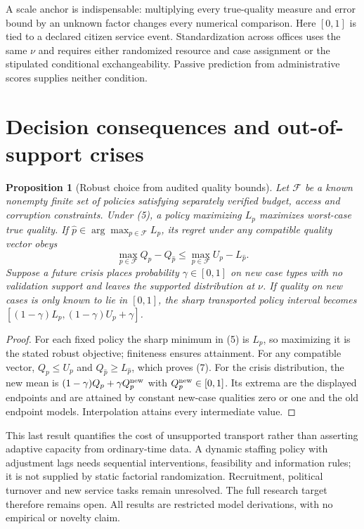 \documentclass[11pt]{article}
\newtheorem{proposition}[theorem]{Proposition}
\begin{document}
A scale anchor is indispensable: multiplying every true-quality measure
and error bound by an unknown factor changes every numerical comparison.
Here $[0,1]$ is tied to a declared citizen service event. Standardization
across offices uses the same $\nu$ and requires either randomized resource
and case assignment or the stipulated conditional exchangeability.
Passive prediction from administrative scores supplies neither condition.

\section{Decision consequences and out-of-support crises}
\begin{proposition}[Robust choice from audited quality bounds]
Let $\mathcal F$ be a known nonempty finite set of policies satisfying
separately verified budget, access and corruption constraints. Under (5),
a policy maximizing $L_p$ maximizes worst-case true quality. If
$\widehat p\in\arg\max_{p\in\mathcal F}L_p$, its regret under any
compatible quality vector obeys
\[
 \max_{p\in\mathcal F}Q_p-Q_{\widehat p}
 \leq\max_{p\in\mathcal F}U_p-L_{\widehat p}.                  \tag{7}
\]
Suppose a future crisis places probability $\gamma\in[0,1]$ on new
case types with no validation support and leaves the supported distribution
at $\nu$. If quality on new cases is only known to lie in $[0,1]$, the
sharp transported policy interval becomes
$[(1-\gamma)L_p,(1-\gamma)U_p+\gamma]$.
\end{proposition}
\begin{proof}
For each fixed policy the sharp minimum in (5) is $L_p$, so maximizing it
is the stated robust objective; finiteness ensures attainment.
For any compatible vector, $Q_p\leq U_p$ and
$Q_{\widehat p}\geq L_{\widehat p}$, which proves (7).
For the crisis distribution, the new mean is
$(1-\gamma)Q_p+\gamma Q_p^{\rm new}$ with
$Q_p^{\rm new}\in[0,1]$. Its extrema are the displayed endpoints and are
attained by constant new-case qualities zero or one and the old endpoint
models. Interpolation attains every intermediate value.
\end{proof}
This last result quantifies the cost of unsupported transport rather than
asserting adaptive capacity from ordinary-time data. A dynamic staffing
policy with adjustment lags needs sequential interventions, feasibility and
information rules; it is not supplied by static factorial randomization.
Recruitment, political turnover and new service tasks remain unresolved.
The full research target therefore remains open. All results are restricted
model derivations, with no empirical or novelty claim.
\end{document}
